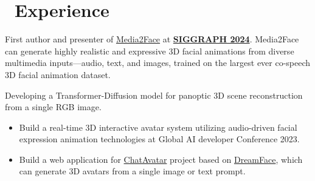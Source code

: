 \documentclass{resume}
\begin{document}
\section{\faUsers\ Experience}


First author and presenter of \href{https://dl.acm.org/doi/10.1145/3641519.3657413}{Media2Face} at \href{https://s2024.conference-program.org/presentation/?id=papers_294&sess=sess116}{\textbf{SIGGRAPH 2024}}.
Media2Face can generate highly realistic and expressive 3D facial animations from diverse multimedia inputs—audio, text, and images, trained on the largest ever co-speech 3D facial animation dataset.


Developing a Transformer-Diffusion model for panoptic 3D scene reconstruction from a single RGB image. 





\begin{itemize}
  \item Build a real-time 3D interactive avatar system utilizing audio-driven facial expression animation technologies at Global AI developer Conference 2023.
  \item Build a web application for \href{https://hyperhuman.deemos.com/}{ChatAvatar} project based on \href{https://dl.acm.org/doi/abs/10.1145/3592094}{DreamFace}, which can generate 3D avatars from a single image or text prompt.
\end{itemize}

\end{document}
